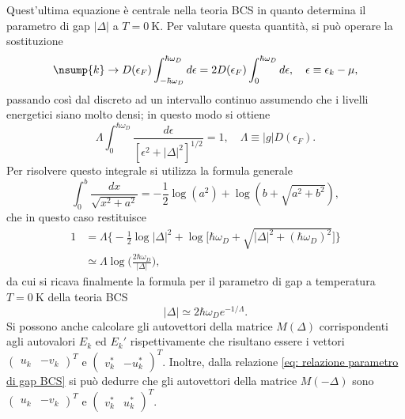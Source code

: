 Quest'ultima equazione è centrale nella teoria BCS in quanto determina il parametro di gap $|\Delta|$ a $T = \SI{0}{\kelvin}$. Per valutare questa quantità, si può operare la sostituzione
\begin{equation}
    \nsump{k} \to D(\epsilon_F)\int_{-\hbar\omega_D}^{\hbar\omega_D}d\epsilon = 2D(\epsilon_F)\int_0^{\hbar\omega_D}d\epsilon,\quad \epsilon \equiv \epsilon_k - \mu,
\end{equation}
passando così dal discreto ad un intervallo continuo assumendo che i livelli energetici siano molto densi; in questo modo si ottiene
\begin{equation}
    \Lambda\int_0^{\hbar\omega_D}\frac{d\epsilon}{[\epsilon^2 + |\Delta|^2]^{1/2}} = 1,\quad \Lambda \equiv |g|D(\epsilon_F).
\end{equation}
Per risolvere questo integrale si utilizza la formula generale
\begin{equation}
    \int_0^b \frac{dx}{\sqrt{x^2 + a^2}} = -\frac{1}{2}\log{(a^2)} + \log{(b + \sqrt{a^2 + b^2})},
\end{equation}
che in questo caso restituisce
\begin{equation}
    \begin{split}
        1 &= \Lambda\bigg\{-\frac{1}{2}\log|\Delta|^2 + \log{\bigg[\hbar\omega_D + \sqrt{|\Delta|^2 + (\hbar\omega_D)^2}\bigg]}\bigg\} \\
        &\simeq \Lambda\log{\bigg(\frac{2\hbar\omega_D}{|\Delta|}\bigg)},
    \end{split}
\end{equation}
da cui si ricava finalmente la formula per il parametro di gap a temperatura $T = \SI{0}{\kelvin}$ della teoria BCS
\begin{equation}
\label{eq: formula parametro gap a T=0 BCS}
    |\Delta| \simeq 2\hbar\omega_De^{-1/\Lambda}.
\end{equation}
Si possono anche calcolare gli autovettori della matrice $M(\Delta)$ corrispondenti agli autovalori $E_k$ ed $E_k'$ rispettivamente che risultano essere i vettori $\begin{pmatrix} u_k & -v_k\end{pmatrix}^T$ e $\begin{pmatrix} v_k^* & -u_k^*\end{pmatrix}^T$. Inoltre, dalla relazione \eqref{eq: relazione parametro di gap BCS} si può dedurre che gli autovettori della matrice $M(-\Delta)$ sono $\begin{pmatrix} u_k & -v_k\end{pmatrix}^T$ e $\begin{pmatrix} v_k^* & u_k^*\end{pmatrix}^T$.

